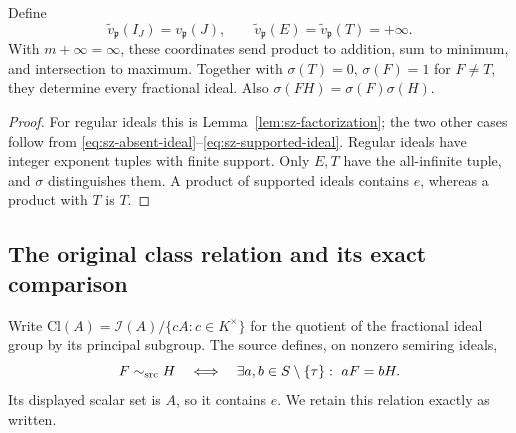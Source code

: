 \begin{proposition}\label{prop:sz-extended-values}
Define
\[
 \widetilde v_{\mathfrak p}(I_J)=v_{\mathfrak p}(J),\qquad
 \widetilde v_{\mathfrak p}(E)=\widetilde v_{\mathfrak p}(T)=+\infty .
\]
With \(m+\infty=\infty\), these coordinates send product to addition,
sum to minimum, and intersection to maximum. Together with
\(\sigma(T)=0\), \(\sigma(F)=1\) for \(F\ne T\), they determine
every fractional ideal. Also \(\sigma(FH)=\sigma(F)\sigma(H)\).
\end{proposition}
\begin{proof}
For regular ideals this is Lemma~\ref{lem:sz-factorization};
the two other cases follow from
\eqref{eq:sz-absent-ideal}--\eqref{eq:sz-supported-ideal}.
Regular ideals have integer exponent tuples with finite support.
Only \(E,T\) have the all-infinite tuple, and \(\sigma\) distinguishes
them. A product of supported ideals contains \(e\), whereas a
product with \(T\) is \(T\).
\end{proof}

\subsection{The original class relation and its exact comparison}

Write \(\mathrm{Cl}(A)=\mathcal I(A)/\{cA:c\in K^\times\}\) for
the quotient of the fractional ideal group by its principal subgroup.
The source \cite[definition before \texttt{thm:class-semigroup}]
{globalization} defines, on nonzero semiring ideals,
\begin{equation}\label{eq:sz-original-class}
 F\sim_{\rm src}H\quad\Longleftrightarrow\quad
 \exists a,b\in S\setminus\{\tau\}:\ aF=bH .
\end{equation}
Its displayed scalar set is \(A\), so it contains \(e\).
We retain this relation exactly as written.

